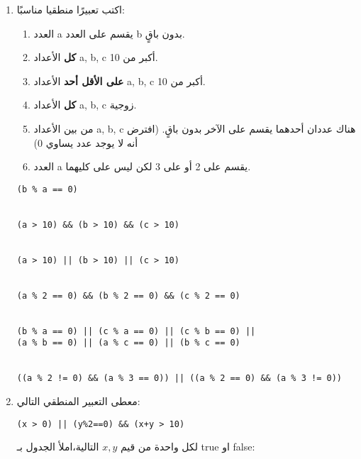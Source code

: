 ﻿\documentclass[12pt]{article}
\begin{document}
\begin{enumerate}[itemsep=3em]
\item
اكتب تعبيرًا منطقيا مناسبًا:
\begin{enumerate}
    \item العدد \textenglish{a} يقسم على العدد \textenglish{b} بدون باقٍ.
    \item \textbf{كل} الأعداد \textenglish{a, b, c} أكبر من 10.
    \item \textbf{على الأقل أحد} الأعداد \textenglish{a, b, c} أكبر من 10.
    \item \textbf{كل} الأعداد \textenglish{a, b, c} زوجية.
    \item من بين الأعداد \textenglish{a, b, c} هناك عددان أحدهما يقسم على الآخر بدون باقٍ. (افترض أنه لا يوجد عدد يساوي 0)
    \item العدد \textenglish{a} يقسم على 2 أو على 3 لكن ليس على كليهما.
\end{enumerate}
\ifwithsols
\begin{boxSolution}
\begin{english}
\begin{verbatim}
(b % a == 0)


(a > 10) && (b > 10) && (c > 10)


(a > 10) || (b > 10) || (c > 10)


(a % 2 == 0) && (b % 2 == 0) && (c % 2 == 0)


(b % a == 0) || (c % a == 0) || (c % b == 0) ||
(a % b == 0) || (a % c == 0) || (b % c == 0)


((a % 2 != 0) && (a % 3 == 0)) || ((a % 2 == 0) && (a % 3 != 0))
\end{verbatim}
\end{english}
\end{boxSolution}
\clearpage
\fi

\item
معطى التعبير المنطقي التالي:
\begin{english}
\begin{verbatim}
(x > 0) || (y%2==0) && (x+y > 10)
\end{verbatim}
\end{english}
لكل واحدة من قيم $x,y$ التالية،املأ الجدول بـ \textenglish{true} او \textenglish{false}:


\end{enumerate}
\end{document}
